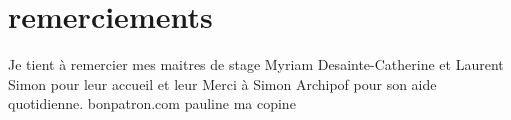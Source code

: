 \chapter*{remerciements}

Je tient à remercier mes maitres de stage Myriam Desainte-Catherine et Laurent Simon pour leur accueil et leur 
Merci à Simon Archipof pour son aide quotidienne.
bonpatron.com
pauline ma copine